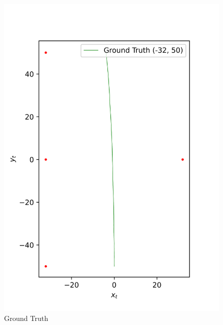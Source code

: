 \begin{figure}[H]
    \centering
    \begin{minipage}{0.49\linewidth}
        \centering
        \includegraphics[width=\linewidth]{plots/part2-f-0-GT.png}
        \caption*{Ground Truth}
    \end{minipage}
    \hfill
    \begin{minipage}{0.49\linewidth}
        \centering

\end{minipage}
\end{figure}
